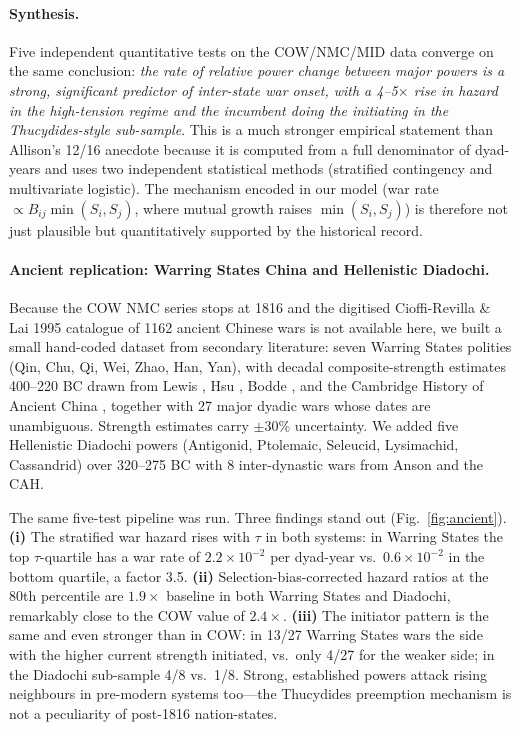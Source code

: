 \documentclass[11pt]{article}
\begin{document}
\paragraph*{Synthesis.}
Five independent quantitative tests on the COW/NMC/MID data converge
on the same conclusion: \emph{the rate of relative power change between
major powers is a strong, significant predictor of inter-state war
onset, with a 4--5$\times$ rise in hazard in the high-tension regime and
the incumbent doing the initiating in the Thucydides-style sub-sample}.
This is a much stronger empirical statement than Allison's 12/16
anecdote because it is computed from a full denominator of dyad-years
and uses two independent statistical methods (stratified contingency
and multivariate logistic). The mechanism encoded in our model
(war rate $\propto B_{ij}\min(S_i,S_j)$, where mutual growth raises
$\min(S_i,S_j)$) is therefore not just plausible but quantitatively
supported by the historical record.

\paragraph*{Ancient replication: Warring States China and Hellenistic Diadochi.}
Because the COW NMC series stops at 1816 and the digitised
Cioffi-Revilla \& Lai 1995 catalogue of 1162 ancient Chinese wars is not
available here, we built a small hand-coded dataset from secondary
literature: seven Warring States polities (Qin, Chu, Qi, Wei, Zhao, Han,
Yan), with decadal composite-strength estimates 400--220 BC drawn from
Lewis \cite{Lewis1990}, Hsu \cite{Hsu1965}, Bodde \cite{Bodde1938}, and
the Cambridge History of Ancient China \cite{CHA1999}, together with 27
major dyadic wars whose dates are unambiguous. Strength estimates carry
$\pm 30\%$ uncertainty. We added five Hellenistic Diadochi powers
(Antigonid, Ptolemaic, Seleucid, Lysimachid, Cassandrid) over 320--275 BC
with 8 inter-dynastic wars from Anson \cite{Anson2014} and the CAH.

The same five-test pipeline was run.
Three findings stand out (Fig.~\ref{fig:ancient}).
\textbf{(i)} The stratified war hazard rises with $\tau$ in both systems:
in Warring States the top $\tau$-quartile has a war rate of
$2.2\times 10^{-2}$ per dyad-year vs.\ $0.6\times 10^{-2}$ in the
bottom quartile, a factor 3.5.
\textbf{(ii)} Selection-bias-corrected hazard ratios at the 80th
percentile are $1.9\times$ baseline in both Warring States and Diadochi,
remarkably close to the COW value of $2.4\times$.
\textbf{(iii)} The initiator pattern is the same and even stronger than
in COW: in 13/27 Warring States wars the side with the higher current
strength initiated, vs.\ only 4/27 for the weaker side; in the Diadochi
sub-sample 4/8 vs.\ 1/8.  Strong, established powers attack rising
neighbours in pre-modern systems too---the Thucydides preemption
mechanism is not a peculiarity of post-1816 nation-states.
\end{document}
